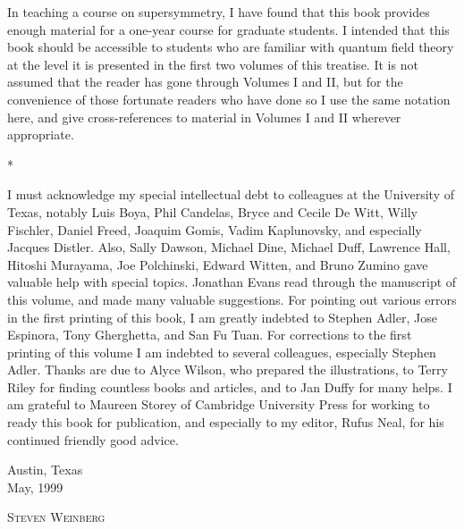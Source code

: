 In teaching a course on supersymmetry, I have found that this book provides
enough material for a one-year course for graduate students. I intended that
this book should be accessible to students who are familiar with quantum field
theory at the level it is presented in the first two volumes of this treatise.
It is not assumed that the reader has gone through Volumes I and II, but for
the convenience of those fortunate readers who have done so I use the same
notation here, and give cross-references to material in Volumes I and II
wherever appropriate.

\begin{center}
  *\quad*\quad*
\end{center}

I must acknowledge my special intellectual debt to colleagues at the University
of Texas, notably Luis Boya, Phil Candelas, Bryce and Cecile De Witt, Willy
Fischler, Daniel Freed, Joaquim Gomis, Vadim Kaplunovsky, and especially Jacques
Distler. Also, Sally Dawson, Michael Dine, Michael Duff, Lawrence Hall, Hitoshi
Murayama, Joe Polchinski, Edward Witten, and Bruno Zumino gave valuable help
with special topics. Jonathan Evans read through the manuscript of this volume,
and made many valuable suggestions. For pointing out various errors in the
first printing of this book, I am greatly indebted to Stephen Adler, Jose
Espinora, Tony Gherghetta, and San Fu Tuan. For corrections to the first
printing of this volume I am indebted to several colleagues, especially Stephen
Adler. Thanks are due to Alyce Wilson, who prepared the illustrations, to Terry
Riley for finding countless books and articles, and to Jan Duffy for many
helps. I am grateful to Maureen Storey of Cambridge University Press for
working to ready this book for publication, and especially to my editor, Rufus
Neal, for his continued friendly good advice.

\vspace{2.5em}
\noindent
\begin{minipage}[t]{0.45\textwidth}
Austin, Texas\\
May, 1999
\end{minipage}
\hfill
\begin{minipage}[t]{0.45\textwidth}
\raggedleft
\textsc{Steven Weinberg}
\end{minipage}
